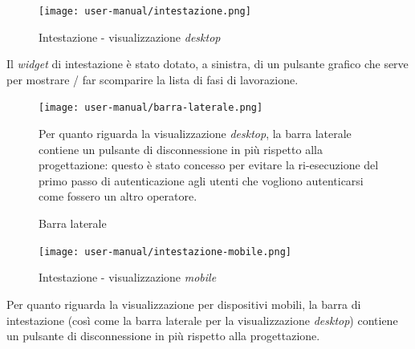 \begin{figure}[H]
  \centering
  \texttt{[image: user-manual/intestazione.png]}
  \caption{Intestazione - visualizzazione \textit{desktop}}
\end{figure}
Il \textit{widget} di intestazione è stato dotato, a sinistra, di un pulsante grafico che serve per mostrare / far scomparire la lista di fasi di lavorazione.

\begin{figure}[H]
  \begin{minipage}{0.3\textwidth}
    \texttt{[image: user-manual/barra-laterale.png]}
    \caption{Barra laterale}
  \end{minipage}%
  \begin{minipage}{0.7\textwidth}
    Per quanto riguarda la visualizzazione \textit{desktop}, la barra laterale contiene un pulsante di disconnessione in più rispetto alla progettazione: questo è stato concesso per evitare la ri-esecuzione del primo passo di autenticazione agli utenti che vogliono autenticarsi come fossero un altro operatore.
  \end{minipage}
  
\end{figure}

\begin{figure}[H]
  \centering
  \texttt{[image: user-manual/intestazione-mobile.png]}
  \caption{Intestazione - visualizzazione \textit{mobile}}
\end{figure}
Per quanto riguarda la visualizzazione per dispositivi mobili, la barra di intestazione (così come la barra laterale per la visualizzazione \textit{desktop}) contiene un pulsante di disconnessione in più rispetto alla progettazione.